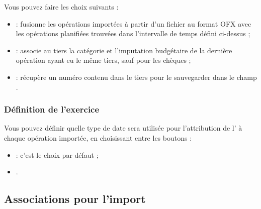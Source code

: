 Vous pouvez faire les choix suivants :

\begin{itemize}
	\item {} : fusionne les opérations importées à partir d'un fichier au format \gls{OFX} avec les opérations planifiées trouvées dans l'intervalle de temps défini ci-dessus ;
	\item {} : associe au tiers la catégorie et l'imputation budgétaire de la dernière opération ayant eu le même tiers, sauf pour les chèques ;
	\item {} : récupère un numéro contenu dans le tiers pour le sauvegarder dans le champ .
\end{itemize}


\subsubsection{Définition de l'exercice\label{setup-general-import-financialyear}}

Vous pouvez définir quelle type de date sera utilisée pour l'attribution de l' à chaque opération importée, en choisissant entre les boutons :

\begin{itemize}
	\item {} : c'est le choix par défaut ;     
	\item {}.
\end{itemize}


\subsection{Associations pour l'import\label{setup-general-importLinks}}

